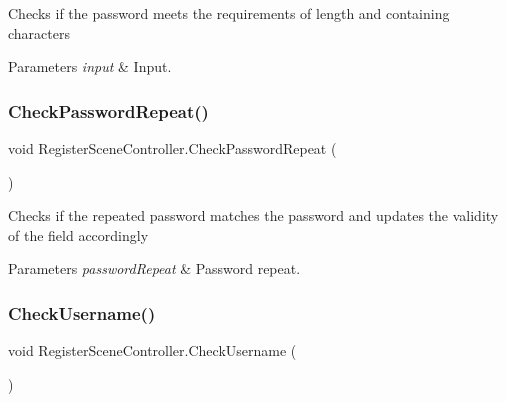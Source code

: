 Checks if the password meets the requirements of length and containing characters 


\begin{DoxyParams}{Parameters}
{\em input} & Input.\\
\hline
\end{DoxyParams}
\mbox{\label{classRegisterSceneController_aecd570e465ac294c6fb89fc88140bb89}} 
\subsubsection{\texorpdfstring{Check\+Password\+Repeat()}{CheckPasswordRepeat()}}
{\footnotesize\ttfamily void Register\+Scene\+Controller.\+Check\+Password\+Repeat (\begin{DoxyParamCaption}{ }\end{DoxyParamCaption})\hspace{0.3cm}{\ttfamily [inline]}}



Checks if the repeated password matches the password and updates the validity of the field accordingly 


\begin{DoxyParams}{Parameters}
{\em password\+Repeat} & Password repeat.\\
\hline
\end{DoxyParams}
\mbox{\label{classRegisterSceneController_a79fc8fdaa225cc89fb7df61421feeb68}} 
\subsubsection{\texorpdfstring{Check\+Username()}{CheckUsername()}}
{\footnotesize\ttfamily void Register\+Scene\+Controller.\+Check\+Username (\begin{DoxyParamCaption}{ }\end{DoxyParamCaption})\hspace{0.3cm}{\ttfamily [inline]}}



